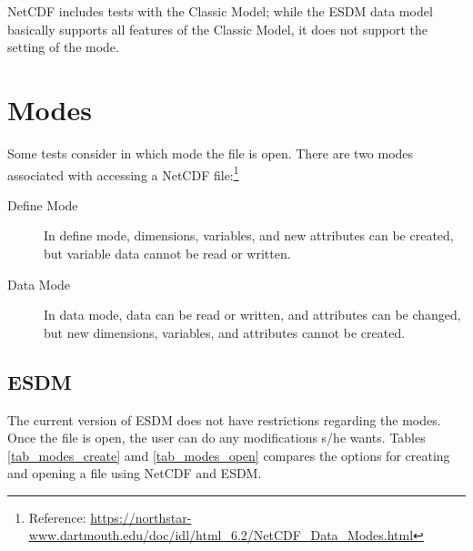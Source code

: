 \tab
NetCDF includes tests with the Classic Model; while the ESDM data model basically supports all features of the Classic Model, it does not support the setting of the mode.

\section{Modes}

\tab
Some tests consider in which mode the file is open. There are two modes associated with accessing a NetCDF file:\footnote{Reference: \url{https://northstar-www.dartmouth.edu/doc/idl/html_6.2/NetCDF_Data_Modes.html}}

\begin{description}

\item[Define Mode] In define mode, dimensions, variables, and new attributes can be created, but variable data cannot be read or written.

\item[Data Mode] In data mode, data can be read or written, and attributes can be changed, but new dimensions, variables, and attributes cannot be created.

\end{description}

\subsection{ESDM}

\tab
The current version of ESDM does not have restrictions regarding the modes. Once the file is open, the user can do any modifications s/he wants. Tables \ref{tab_modes_create} amd \ref{tab_modes_open} compares the options for creating and opening a file using NetCDF and ESDM.

